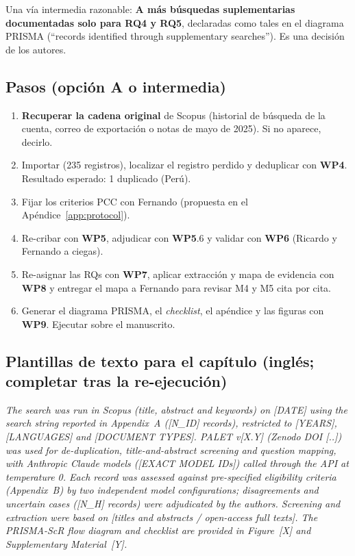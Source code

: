 \documentclass[11pt,a4paper]{article}
\newcommand{\WP}[1]{\textbf{\textcolor{palet}{WP#1}}}
\begin{document}
Una vía intermedia razonable: \textbf{A más búsquedas suplementarias documentadas solo para RQ4 y RQ5}, declaradas como tales en el diagrama PRISMA (``records identified through supplementary searches''). Es una decisión de los autores.

\subsection{Pasos (opción A o intermedia)}
\begin{enumerate}
  \item \textbf{Recuperar la cadena original} de Scopus (historial de búsqueda de la cuenta, correo de exportación o notas de mayo de 2025). Si no aparece, decirlo.
  \item Importar  (235 registros), localizar el registro perdido y deduplicar con \WP{4}. Resultado esperado: 1 duplicado (Perú).
  \item Fijar los criterios PCC con Fernando (propuesta en el Apéndice~\ref{app:protocol}).
  \item Re-cribar con \WP{5}, adjudicar con \WP{5}.6 y validar con \WP{6} (Ricardo y Fernando a ciegas).
  \item Re-asignar las RQs con \WP{7}, aplicar extracción y mapa de evidencia con \WP{8} y entregar el mapa a Fernando para revisar M4 y M5 cita por cita.
  \item Generar el diagrama PRISMA, el \emph{checklist}, el apéndice y las figuras con \WP{9}. Ejecutar  sobre el manuscrito.
\end{enumerate}

\subsection{Plantillas de texto para el capítulo (inglés; completar tras la re-ejecución)}

\begin{nota}
\small
\emph{The search was run in Scopus (title, abstract and keywords) on [DATE] using the search string reported in Appendix~A ([N\_ID] records), restricted to [YEARS], [LANGUAGES] and [DOCUMENT TYPES]. PALET v[X.Y] (Zenodo DOI [..]) was used for de-duplication, title-and-abstract screening and question mapping, with Anthropic Claude models ([EXACT MODEL IDs]) called through the API at temperature 0. Each record was assessed against pre-specified eligibility criteria (Appendix~B) by two independent model configurations; disagreements and uncertain cases ([N\_H] records) were adjudicated by the authors. Screening and extraction were based on [titles and abstracts / open-access full texts]. The PRISMA-ScR flow diagram and checklist are provided in Figure~[X] and Supplementary Material~[Y].}
\end{nota}
\end{document}
